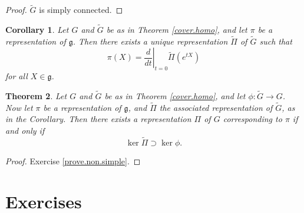 \documentclass{amsbook}
\let \frak = \mathfrak
\theoremstyle{plain}
\newtheorem{theorem}{Theorem}
\newtheorem{corollary}[theorem]{Corollary}
\numberwithin{equation}{chapter}
\numberwithin{theorem}{chapter}
\begin{document}
\begin{proof}
$\widetilde{G}$ is simply connected.
\end{proof}

\begin{corollary}
Let $G$ and $\widetilde{G}$ be as in Theorem \ref{cover.homo}, and let $\pi$
be a representation of $\frak{g}$. Then there exists a unique representation
$\widetilde{\Pi}$ of $\widetilde{G}$ such that
\[
\pi(X)=\left.  \frac{d}{dt}\right|  _{t=0}\widetilde{\Pi}\left(
e^{tX}\right)
\]
for all $X\in\frak{g}$.
\end{corollary}

\begin{theorem}
\label{non.simple}Let $G$ and $\widetilde{G}$ be as in Theorem
\ref{cover.homo}, and let $\phi:\widetilde{G}\rightarrow G$. Now let $\pi$ be
a representation of $\frak{g}$, and $\widetilde{\Pi}$ the associated
representation of $\widetilde{G}$, as in the Corollary. Then there exists a
representation $\Pi$ of $G$ corresponding to $\pi$ if and only if
\[
\ker\widetilde{\Pi}\supset\ker\phi\text{.}%
\]
\end{theorem}

\begin{proof}
Exercise \ref{prove.non.simple}.
\end{proof}

\section{Exercises}
\end{document}

